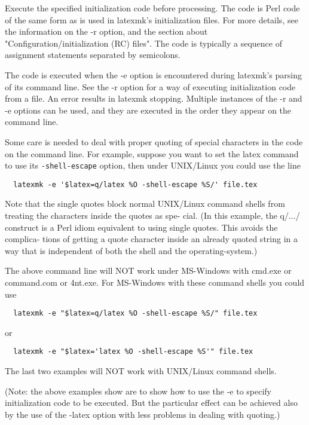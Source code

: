 Execute  the  specified  initialization  code before processing.  The code is
Perl code of the same form as is used  in  latexmk's initialization  files.
For more details, see the information on the -r option, and the section about
"Configuration/initialization  (RC)  files".  The code is typically a
sequence of assignment statements separated by semicolons.

The code is executed when the -e option  is  encountered  during latexmk's
parsing of its command line.  See the -r option for a way of executing
initialization code from a file.  An error  results  in latexmk stopping.
Multiple instances of the -r and -e options can be used, and they are executed
in the order they appear on the command line.

Some care is needed to deal with proper quoting of special characters in the
code on the command line.   For  example,  suppose you  want  to set the latex
command to use its \verb|-shell-escape| option, then under UNIX/Linux you could use
the line

\begin{verbatim}
  latexmk -e '$latex=q/latex %O -shell-escape %S/' file.tex
\end{verbatim}

Note that the single  quotes  block  normal  UNIX/Linux  command shells  from
treating  the characters inside the quotes as spe- cial.  (In this example, the
q/.../ construct is  a  Perl  idiom equivalent  to  using  single quotes.  This
avoids the complica- tions of getting a quote  character  inside  an  already
quoted string  in  a  way that is independent of both the shell and the
operating-system.)

The above command line  will  NOT  work  under  MS-Windows  with
cmd.exe  or  command.com  or 4nt.exe.  For MS-Windows with these
command shells you could use

\begin{verbatim}
  latexmk -e "$latex=q/latex %O -shell-escape %S/" file.tex
\end{verbatim}

or

\begin{verbatim}
  latexmk -e "$latex='latex %O -shell-escape %S'" file.tex
\end{verbatim}

The last two examples will  NOT  work  with  UNIX/Linux  command
shells.

(Note:  the above examples show are to show how to use the -e to specify
initialization code to be executed.  But the  particular effect can be achieved
also by the use of the -latex option with less problems in dealing with
quoting.)

